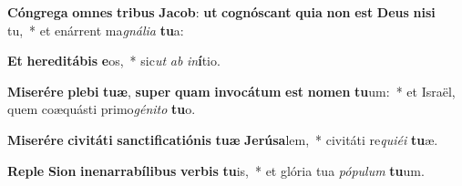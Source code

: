 \item \textbf{Cón}\textbf{gre}\textbf{ga} \textbf{om}\textbf{nes} \textbf{tri}\textbf{bus} \textbf{Ja}\textbf{cob}: \textbf{ut} \textbf{co}\textbf{gnós}\textbf{cant} \textbf{qui}\textbf{a} \textbf{non} \textbf{est} \textbf{De}\textbf{us} \textbf{ni}\textbf{si} tu,~* et enárrent ma\textit{gná}\textit{li}\textit{a} \textbf{tu}a:
\item \textbf{Et} \textbf{he}\textbf{re}\textbf{di}\textbf{tá}\textbf{bis} \textbf{e}os,~* sic\textit{ut} \textit{ab} \textit{in}\textbf{í}tio.
\item \textbf{Mi}\textbf{se}\textbf{ré}\textbf{re} \textbf{ple}\textbf{bi} \textbf{tu}\textbf{æ}, \textbf{su}\textbf{per} \textbf{quam} \textbf{in}\textbf{vo}\textbf{cá}\textbf{tum} \textbf{est} \textbf{no}\textbf{men} \textbf{tu}um:~* et Israël, quem coæquásti primo\textit{gé}\textit{ni}\textit{to} \textbf{tu}o.
\item \textbf{Mi}\textbf{se}\textbf{ré}\textbf{re} \textbf{ci}\textbf{vi}\textbf{tá}\textbf{ti} \textbf{sanc}\textbf{ti}\textbf{fi}\textbf{ca}\textbf{ti}\textbf{ó}\textbf{nis} \textbf{tu}\textbf{æ} \textbf{Je}\textbf{rú}\textbf{sa}lem,~* civitáti re\textit{qui}\textit{é}\textit{i} \textbf{tu}æ.
\item \textbf{Re}\textbf{ple} \textbf{Si}\textbf{on} \textbf{in}\textbf{e}\textbf{nar}\textbf{ra}\textbf{bí}\textbf{li}\textbf{bus} \textbf{ver}\textbf{bis} \textbf{tu}is,~* et glória tua \textit{pó}\textit{pu}\textit{lum} \textbf{tu}um.
